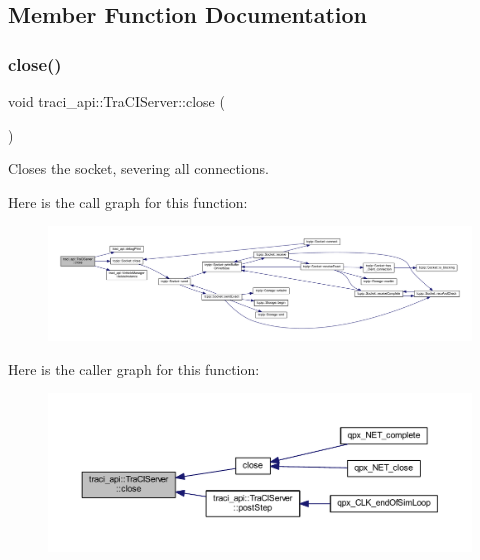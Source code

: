 \subsection{Member Function Documentation}
\mbox{\label{classtraci__api_1_1_tra_c_i_server_a1fd920907cde7ef5a10d078aec34080a}} 
\subsubsection{\texorpdfstring{close()}{close()}}
{\footnotesize\ttfamily void traci\+\_\+api\+::\+Tra\+C\+I\+Server\+::close (\begin{DoxyParamCaption}{ }\end{DoxyParamCaption})}



Closes the socket, severing all connections. 

Here is the call graph for this function\+:\nopagebreak
\begin{figure}[H]
\begin{center}
\leavevmode
\includegraphics[width=350pt]{classtraci__api_1_1_tra_c_i_server_a1fd920907cde7ef5a10d078aec34080a_cgraph}
\end{center}
\end{figure}
Here is the caller graph for this function\+:\nopagebreak
\begin{figure}[H]
\begin{center}
\leavevmode
\includegraphics[width=350pt]{classtraci__api_1_1_tra_c_i_server_a1fd920907cde7ef5a10d078aec34080a_icgraph}
\end{center}
\end{figure}
\mbox{\label{classtraci__api_1_1_tra_c_i_server_af4814a9a99d79f4e00fc102169d10cc2}} 
